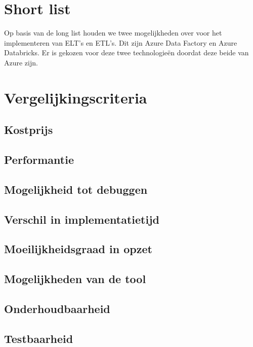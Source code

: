 \section{Short list}

Op basis van de long list houden we twee mogelijkheden over voor het implementeren van ELT's en ETL's. Dit zijn Azure Data Factory en Azure Databricks. Er is gekozen voor deze twee technologieën doordat deze beide van Azure zijn. 

\section{Vergelijkingscriteria}

\subsection{Kostprijs}

\subsection{Performantie}

\subsection{Mogelijkheid tot debuggen}

\subsection{Verschil in implementatietijd}

\subsection{Moeilijkheidsgraad in opzet}

\subsection{Mogelijkheden van de tool}

\subsection{Onderhoudbaarheid}

\subsection{Testbaarheid}

